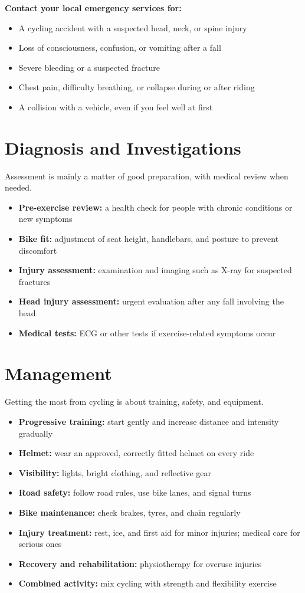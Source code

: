 \textbf{Contact your local emergency services for:}
\begin{itemize}
    \item A cycling accident with a suspected head, neck, or spine injury
    \item Loss of consciousness, confusion, or vomiting after a fall
    \item Severe bleeding or a suspected fracture
    \item Chest pain, difficulty breathing, or collapse during or after riding
    \item A collision with a vehicle, even if you feel well at first
\end{itemize}

\section*{Diagnosis and Investigations}
Assessment is mainly a matter of good preparation, with medical review when needed.

\begin{itemize}
    \item \textbf{Pre-exercise review:} a health check for people with chronic conditions or new symptoms
    \item \textbf{Bike fit:} adjustment of seat height, handlebars, and posture to prevent discomfort
    \item \textbf{Injury assessment:} examination and imaging such as X-ray for suspected fractures
    \item \textbf{Head injury assessment:} urgent evaluation after any fall involving the head
    \item \textbf{Medical tests:} ECG or other tests if exercise-related symptoms occur
\end{itemize}

\section*{Management}
Getting the most from cycling is about training, safety, and equipment.

\begin{itemize}
    \item \textbf{Progressive training:} start gently and increase distance and intensity gradually
    \item \textbf{Helmet:} wear an approved, correctly fitted helmet on every ride
    \item \textbf{Visibility:} lights, bright clothing, and reflective gear
    \item \textbf{Road safety:} follow road rules, use bike lanes, and signal turns
    \item \textbf{Bike maintenance:} check brakes, tyres, and chain regularly
    \item \textbf{Injury treatment:} rest, ice, and first aid for minor injuries; medical care for serious ones
    \item \textbf{Recovery and rehabilitation:} physiotherapy for overuse injuries
    \item \textbf{Combined activity:} mix cycling with strength and flexibility exercise
\end{itemize}

